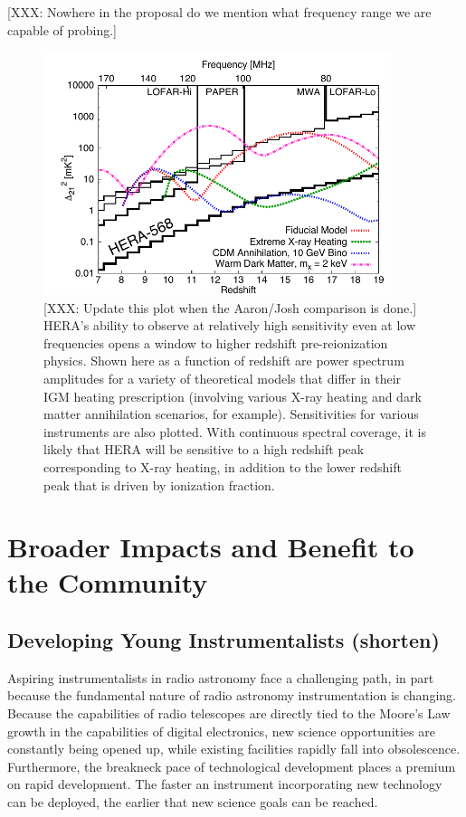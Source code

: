 \documentclass[preprint]{aastex}
\begin{document}
[XXX: Nowhere in the proposal do we mention what frequency range we are capable of probing.]

\begin{figure}[!ht]\centering
\includegraphics[width=4in]{plots/Xray.pdf}
\caption{\small
[XXX: Update this plot when the Aaron/Josh comparison is done.] HERA's ability to
observe at relatively high sensitivity even at low frequencies opens a window to
higher redshift pre-reionization physics.  Shown here as a function of redshift are power spectrum amplitudes
for a variety of theoretical models that differ in their IGM heating prescription (involving various X-ray heating
and dark matter annihilation scenarios, for example).  Sensitivities for various instruments are also plotted.
With continuous spectral coverage, it is likely that HERA will be sensitive to a high redshift peak corresponding
to X-ray heating, in addition to the lower redshift peak that is driven by ionization fraction.
}\label{fig:Xray}
\end{figure}


\section{Broader Impacts and Benefit to the Community}
\label{BIsec}

\subsection{Developing Young Instrumentalists (shorten)}

Aspiring instrumentalists in radio astronomy face a challenging path, in part because
the fundamental nature of radio astronomy instrumentation is changing.
Because the capabilities of radio telescopes are directly tied to the Moore's Law
growth in the capabilities of digital electronics,
new science opportunities are constantly being opened up, while existing
facilities rapidly fall into obsolescence.
Furthermore,
the breakneck pace of technological development places a premium on rapid development.
The faster an instrument incorporating new technology can be deployed,
the earlier that new science goals can be reached.
\end{document}
